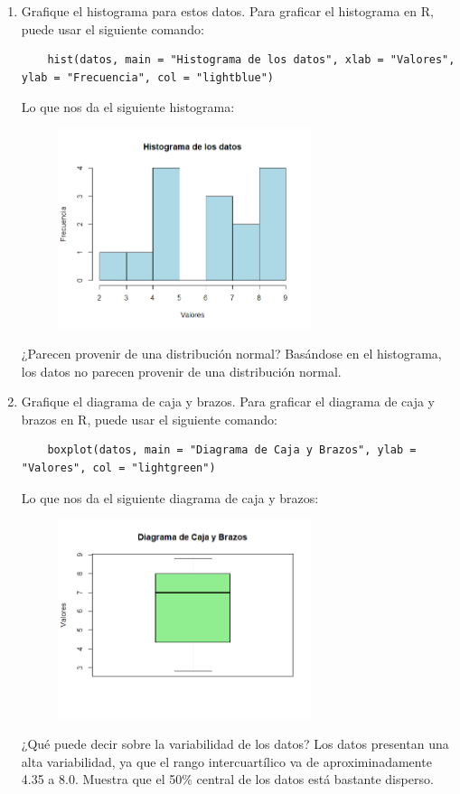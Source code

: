 \documentclass[12pt,a4paper]{article}
\begin{document}
\begin{itemize}
\begin{enumerate}
\item Grafique el histograma para estos datos. Para graficar el histograma en R, puede usar el siguiente comando:
\begin{lstlisting}
    hist(datos, main = "Histograma de los datos", xlab = "Valores", ylab = "Frecuencia", col = "lightblue")
\end{lstlisting}
Lo que nos da el siguiente histograma:
\begin{figure}[H]
    \centering
    \includegraphics[width=0.7\textwidth]{img/Histograma.png}
\end{figure}
¿Parecen provenir de una distribución normal? Basándose en el histograma, los datos no parecen provenir de una distribución normal.

\vfill

\item Grafique el diagrama de caja y brazos. Para graficar el diagrama de caja y brazos en R, puede usar el siguiente comando:
\begin{lstlisting}
    boxplot(datos, main = "Diagrama de Caja y Brazos", ylab = "Valores", col = "lightgreen")
\end{lstlisting}
Lo que nos da el siguiente diagrama de caja y brazos:
\begin{figure}[H]
    \centering
    \includegraphics[width=0.7\textwidth]{img/DiagramaCajas.png}
\end{figure}
¿Qué puede decir sobre la variabilidad de los datos? Los datos presentan una alta variabilidad, ya que el rango intercuartílico va de aproximinadamente 4.35 a 8.0. Muestra que el 50\% central de los datos está bastante disperso.

\end{enumerate}

\end{itemize}
\end{document}
